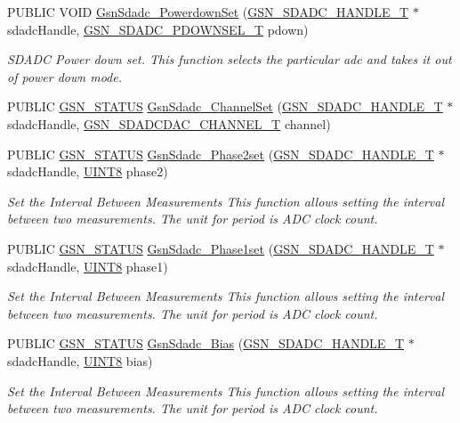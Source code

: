 \begin{DoxyCompactItemize}
PUBLIC VOID \hyperlink{a00652_ga8c97796c009f87dc85fea1d9903b5fe3}{GsnSdadc\_\-PowerdownSet} (\hyperlink{a00214}{GSN\_\-SDADC\_\-HANDLE\_\-T} $\ast$sdadcHandle, \hyperlink{a00652_gaa6002bca137b8b6b143379be96c9564b}{GSN\_\-SDADC\_\-PDOWNSEL\_\-T} pdown)
\begin{DoxyCompactList}\small\item\em SDADC Power down set. This function selects the particular adc and takes it out of power down mode. \end{DoxyCompactList}\item 
PUBLIC \hyperlink{a00660_gada5951904ac6110b1fa95e51a9ddc217}{GSN\_\-STATUS} \hyperlink{a00583_a79e42538d9576d9a26c0a019389a4320}{GsnSdadc\_\-ChannelSet} (\hyperlink{a00214}{GSN\_\-SDADC\_\-HANDLE\_\-T} $\ast$sdadcHandle, \hyperlink{a00583_ad966c1e6c604f6107d0b76e6390e58ff}{GSN\_\-SDADCDAC\_\-CHANNEL\_\-T} channel)
\item 
PUBLIC \hyperlink{a00660_gada5951904ac6110b1fa95e51a9ddc217}{GSN\_\-STATUS} \hyperlink{a00652_gab713a736854b758a0e5034cef7907731}{GsnSdadc\_\-Phase2set} (\hyperlink{a00214}{GSN\_\-SDADC\_\-HANDLE\_\-T} $\ast$sdadcHandle, \hyperlink{a00660_gab27e9918b538ce9d8ca692479b375b6a}{UINT8} phase2)
\begin{DoxyCompactList}\small\item\em Set the Interval Between Measurements This function allows setting the interval between two measurements. The unit for period is ADC clock count. \end{DoxyCompactList}\item 
PUBLIC \hyperlink{a00660_gada5951904ac6110b1fa95e51a9ddc217}{GSN\_\-STATUS} \hyperlink{a00652_gaf0a81b59531c9a725cdcc9349c2aa9a3}{GsnSdadc\_\-Phase1set} (\hyperlink{a00214}{GSN\_\-SDADC\_\-HANDLE\_\-T} $\ast$sdadcHandle, \hyperlink{a00660_gab27e9918b538ce9d8ca692479b375b6a}{UINT8} phase1)
\begin{DoxyCompactList}\small\item\em Set the Interval Between Measurements This function allows setting the interval between two measurements. The unit for period is ADC clock count. \end{DoxyCompactList}\item 
PUBLIC \hyperlink{a00660_gada5951904ac6110b1fa95e51a9ddc217}{GSN\_\-STATUS} \hyperlink{a00652_gac6eb69b9aca0daca189ca1438bc2b9c4}{GsnSdadc\_\-Bias} (\hyperlink{a00214}{GSN\_\-SDADC\_\-HANDLE\_\-T} $\ast$sdadcHandle, \hyperlink{a00660_gab27e9918b538ce9d8ca692479b375b6a}{UINT8} bias)
\begin{DoxyCompactList}\small\item\em Set the Interval Between Measurements This function allows setting the interval between two measurements. The unit for period is ADC clock count. \end{DoxyCompactList}\item 

\end{DoxyCompactItemize}
